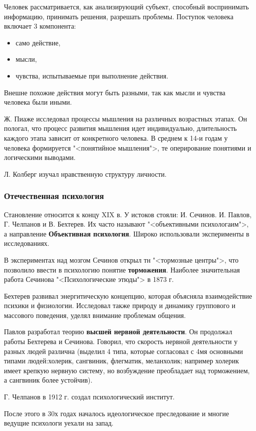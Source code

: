 Человек рассматривается, как анализирующий субъект, способный воспринимать информацию, принимать решения, разрешать проблемы. Поступок человека включает 3 компонента:
\begin{itemize}
	\item само действие,
	\item мысли,
	\item чувства, испытываемые при выполнение действия.
\end{itemize}
Внешне похожие действия могут быть разными, так как мысли и чувства человека были иными.

Ж. Пиаже исследовал процессы мышления на различных возрастных этапах. Он пологал, что процесс развития мышления идет индивидуально, длительность каждого этапа зависит от конкретного человека. В среднем к 14-и годам у человека формируется "<понятийное мышления">, те оперирование понятиями и логическими выводами.

Л. Колберг изучал нравственную структуру личности.

\subsubsection{Отечественная психология}
Становление относится к концу XIX в. У истоков стояли: И. Сечинов. И. Павлов, Г. Челпанов и В. Бехтерев. Их часто называют "<объективными психологаим">, а направление \textbf{Объективная психология}. Широко использовали эксперименты в исследованиях.

В экспериментах над мозгом Сечинов открыл тн "<тормозные центры">, что позволило ввести в психологию понятие \textbf{торможения}. Наиболее значительная работа Сечинова "<Психологические этюды"> в 1873 г.

Бехтерев развивал энергитическую концепцию, которая объясняла взаимодействие психики и физиологии. Исследовал также природу и динамику группового и массового поведения, уделял внимание проблемам общения.

Павлов разработал теорию \textbf{высшей нервной деятельности}. Он продолжал работы Бехтерева и Сечинова. Говорил, что скорость нервной деятельности у разных людей различна (выделил 4 типа, которые согласовал с 4мя основными типами людей:холерик, сангвиник, флегматик, меланхолик; например холерик имеет крепкую нервную систему, но возбуждение преобладает над торможением, а сангвиник более устойчив).

Г. Челпанов в 1912 г. создал психологический институт.

После этого в 30х годах началось идеологическое преследование и многие ведущие психологи уехали на запад.

